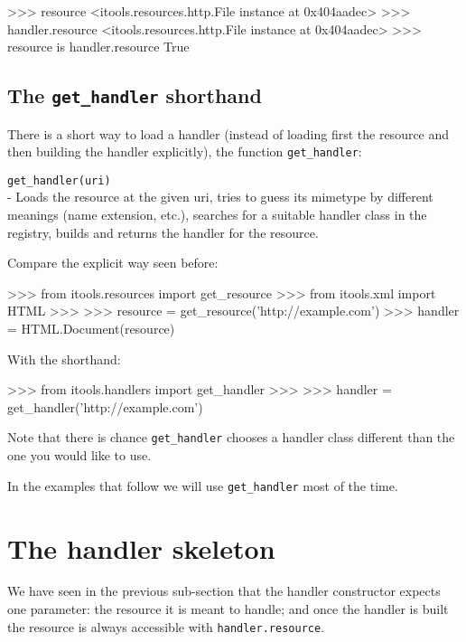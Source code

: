 \begin{code}
    >>> resource
    <itools.resources.http.File instance at 0x404aadec>
    >>> handler.resource
    <itools.resources.http.File instance at 0x404aadec>
    >>> resource is handler.resource
    True
\end{code}


\subsection{The {\tt get\_handler} shorthand}

There is a short way to load a handler (instead of loading first the resource
and then building the handler explicitly), the function {\tt get\_handler}:

\begin{api}
  {\tt get\_handler(uri)}\\
  - Loads the resource at the given uri, tries to guess its mimetype by
  different meanings (name extension, etc.), searches for a suitable
  handler class in the registry, builds and returns the handler for
  the resource.
\end{api}

Compare the explicit way seen before:

\begin{code}
    >>> from itools.resources import get_resource
    >>> from itools.xml import HTML
    >>>
    >>> resource = get_resource('http://example.com')
    >>> handler = HTML.Document(resource)
\end{code}

With the shorthand:

\begin{code}
    >>> from itools.handlers import get_handler
    >>>
    >>> handler = get_handler('http://example.com')
\end{code}

Note that there is chance {\tt get\_handler} chooses a handler class
different than the one you would like to use.

In the examples that follow we will use {\tt get\_handler} most of the
time.


\section{The handler skeleton}

We have seen in the previous sub-section that the handler constructor expects
one parameter: the resource it is meant to handle; and once the handler is
built the resource is always accessible with {\tt handler.resource}.

